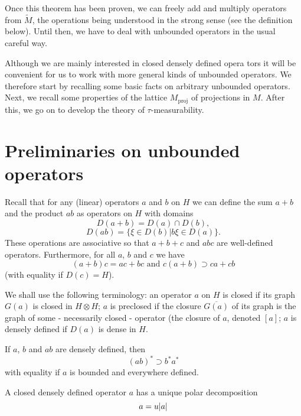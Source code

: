 Once this theorem has been proven, we can freely add and multiply operators from $\widetilde{M}$, the operations being understood in the strong sense (see the definition below). Until then, we have to deal with unbounded operators in the usual careful way.\par
Although we are mainly interested in closed densely defined opera tors it will be convenient for us to work with more general kinds of unbounded operators. We therefore start by recalling some basic facts on arbitrary unbounded operators. Next, we recall some properties of the lattice $M_{\text{proj}}$ of projections in $M$. After this, we go on to develop the theory of $\tau$-measurability.\par

\section{Preliminaries on unbounded operators}
Recall that for any (linear) operators $a$ and $b$ on $H$ we can define the sum $a+b$ and the product $ab$ as operators on $H$ with domains
\begin{equation}
    D(a+b)=D(a)\cap D(b),
\end{equation}
\begin{equation}
    D(ab)=\{\xi\in D(b)|b\xi\in D(a)\}.
\end{equation}
These operations are associative so that $a+b+c$ and $abc$ are well-defined operators. Furthermore, for all $a$, $b$ and $c$ we have
\begin{equation}
    (a+b)c = ac + bc \text{ and } c(a+b)\supset ca + cb
\end{equation}
(with equality if $D(c)=H$).\par
We shall use the following terminology: an operator $a$ on $H$ is closed if its graph $G(a)$ is closed in $H\otimes H$; $a$ is preclosed if the closure $\overline{G(a)}$ of its graph is the graph of some - necessarily closed - operator (the closure of $a$, denoted $[a]$; $a$ is densely defined if $D(a)$ is dense in $H$.\par
If $a$, $b$ and $ab$ are densely defined, then
\begin{equation}
    (ab)^*\supset b^*a^*
\end{equation}
with equality if $a$ is bounded and everywhere defined.\par
A closed densely defined operator $a$ has a unique polar decomposition
\begin{equation}
    a = u\abs{a}
\end{equation}
